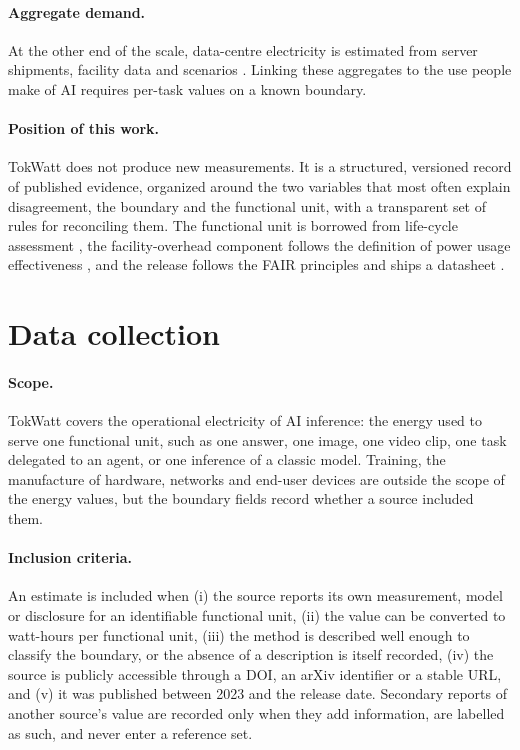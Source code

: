 \documentclass[11pt]{article}
\begin{document}
\paragraph{Aggregate demand.}
At the other end of the scale, data-centre electricity is estimated from server shipments, facility data and scenarios \citep{masanet2020recalibrating,shehabi2024lbnl,iea2025energyai}. Linking these aggregates to the use people make of AI requires per-task values on a known boundary.

\paragraph{Position of this work.}
TokWatt does not produce new measurements. It is a structured, versioned record of published evidence, organized around the two variables that most often explain disagreement, the boundary and the functional unit, with a transparent set of rules for reconciling them. The functional unit is borrowed from life-cycle assessment \citep{iso14040}, the facility-overhead component follows the definition of power usage effectiveness \citep[PUE;][]{iso30134}, and the release follows the FAIR principles \citep{wilkinson2016fair} and ships a datasheet \citep{gebru2021datasheets}.

\section{Data collection}
\label{sec:collection}

\paragraph{Scope.}
TokWatt covers the operational electricity of AI inference: the energy used to serve one functional unit, such as one answer, one image, one video clip, one task delegated to an agent, or one inference of a classic model. Training, the manufacture of hardware, networks and end-user devices are outside the scope of the energy values, but the boundary fields record whether a source included them.

\paragraph{Inclusion criteria.}
An estimate is included when (i) the source reports its own measurement, model or disclosure for an identifiable functional unit, (ii) the value can be converted to watt-hours per functional unit, (iii) the method is described well enough to classify the boundary, or the absence of a description is itself recorded, (iv) the source is publicly accessible through a DOI, an arXiv identifier or a stable URL, and (v) it was published between 2023 and the release date. Secondary reports of another source's value are recorded only when they add information, are labelled as such, and never enter a reference set.
\end{document}
